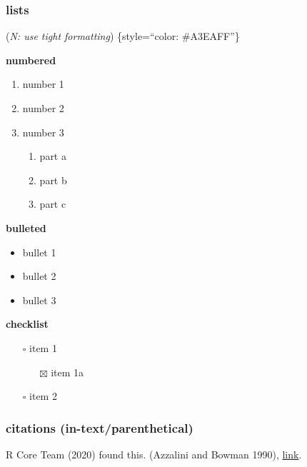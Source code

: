 \documentclass[
]{article}
\providecommand{\tightlist}{%
  \setlength{\itemsep}{0pt}\setlength{\parskip}{0pt}}
\begin{document}
\hypertarget{lists}{%
\subsubsection{lists}\label{lists}}

(\emph{N: use tight formatting}) \{style=``color: \#A3EAFF''\}

\textbf{numbered}

\begin{enumerate}
\def\labelenumi{\arabic{enumi}.}
\item
  number 1
\item
  number 2
\item
  number 3

  \begin{enumerate}
  \def\labelenumii{\alph{enumii})}
  \tightlist
  \item
    part a
  \item
    part b
  \item
    part c
  \end{enumerate}
\end{enumerate}

\textbf{bulleted}

\begin{itemize}
\tightlist
\item
  bullet 1
\item
  bullet 2
\item
  bullet 3
\end{itemize}

\textbf{checklist}

\begin{itemize}
\item[$\square$]
  item 1

  \begin{itemize}
  \tightlist
  \item[$\boxtimes$]
    item 1a
  \end{itemize}
\item[$\square$]
  item 2
\end{itemize}

\hypertarget{citations-in-textparenthetical}{%
\subsubsection{citations
(in-text/parenthetical)}\label{citations-in-textparenthetical}}

R Core Team (2020) found this. (Azzalini and Bowman 1990),
\href{https://bookdown.org/yihui/rmarkdown-cookbook/html-css.html}{link}.
\end{document}

